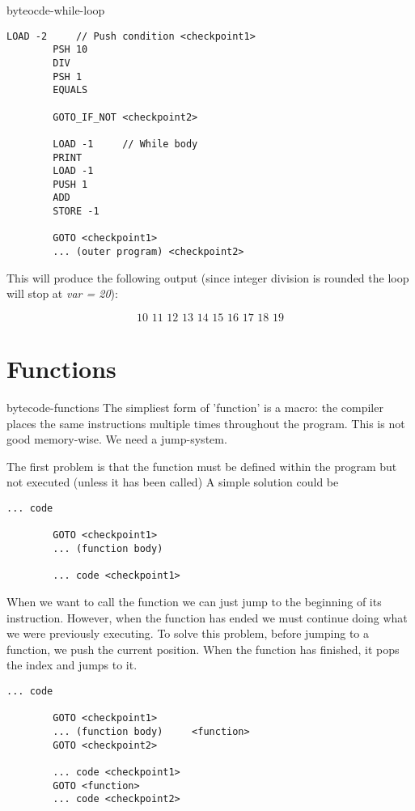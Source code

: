 \documentclass[preview]{standalone}
\begin{document}
\begin{snippet}{byteocde-while-loop}
\begin{lstlisting}[style=generic]
        LOAD -2     // Push condition <checkpoint1>
        PSH 10
        DIV
        PSH 1
        EQUALS
        
        GOTO_IF_NOT <checkpoint2>
        
        LOAD -1     // While body
        PRINT
        LOAD -1
        PUSH 1
        ADD
        STORE -1
    
        GOTO <checkpoint1>
        ... (outer program) <checkpoint2>
    \end{lstlisting}
    
    This will produce the following output (since integer division is rounded the loop will stop at \textit{var = 20}):
    
    \[
        10\,\,11\,\,12\,\,13\,\,14\,\,15\,\,16\,\,17\,\,18\,\,19
    \]
\end{snippet}

\section{Functions}

\begin{snippet}{bytecode-functions}
    The simpliest form of 'function' is a macro: the compiler places the same instructions multiple times throughout the program.
    This is not good memory-wise. We need a jump-system.
    
    The first problem is that the function must be defined within the program but not executed (unless it has been called)
    A simple solution could be
    
    \begin{lstlisting}[style=generic]
        ... code
    
        GOTO <checkpoint1>
        ... (function body)
    
        ... code <checkpoint1>
    \end{lstlisting}
    
    When we want to call the function we can just jump to the beginning of its instruction.
    However, when the function has ended we must continue doing what we were previously executing.
    To solve this problem, before jumping to a function, we push the current position.
    When the function has finished, it pops the index and jumps to it.
    
    \begin{lstlisting}[style=generic]
        ... code
    
        GOTO <checkpoint1>
        ... (function body)     <function>
        GOTO <checkpoint2>
        
        ... code <checkpoint1>
        GOTO <function>
        ... code <checkpoint2>
    \end{lstlisting}
\end{snippet}
\end{document}

